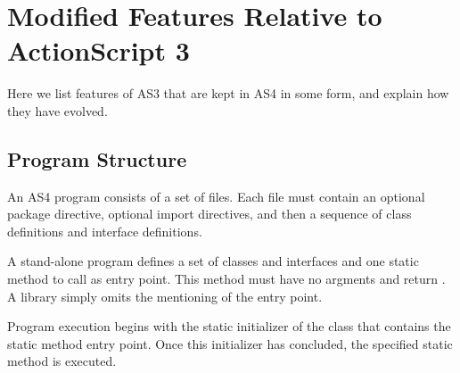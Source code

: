 



\section{Modified Features Relative to ActionScript 3}
\label{changes}
Here we list features of AS3 that are
kept in AS4 in some form, and explain how they have evolved.

\subsection {Program Structure}
\label{programStructure}
An AS4 program consists of a set of files. Each file must contain an optional package directive, optional import
directives, and then a sequence of class definitions and interface definitions.

A stand-alone program defines a set of classes and interfaces and one static method to call as entry point.
This method must have no argments and return . A library simply omits the mentioning of the entry point.

Program execution begins with the static initializer of the class that contains the static method entry point. Once this
initializer has concluded, the specified static method is executed.

